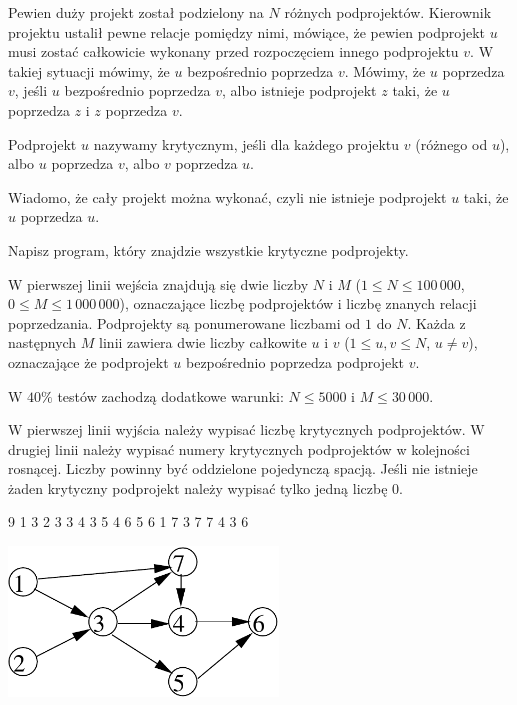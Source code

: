 

\usepackage[utf8]{inputenc}
\usepackage[T1]{fontenc}
\usepackage[polish]{babel}
\usepackage{polski}





Pewien duży projekt został podzielony na $N$ różnych podprojektów.
Kierownik projektu ustalił pewne relacje pomiędzy nimi, mówiące, że pewien podprojekt $u$
	musi zostać całkowicie wykonany przed rozpoczęciem innego podprojektu $v$.
W takiej sytuacji mówimy, że $u$ bezpośrednio poprzedza $v$.
Mówimy, że $u$ poprzedza $v$, jeśli $u$ bezpośrednio poprzedza $v$, albo istnieje podprojekt $z$ taki,
	że $u$ poprzedza $z$ i $z$ poprzedza $v$.

Podprojekt $u$ nazywamy krytycznym, jeśli dla każdego projektu $v$ (różnego od $u$),
	albo $u$ poprzedza $v$, albo $v$ poprzedza $u$.

Wiadomo, że cały projekt można wykonać, czyli nie istnieje podprojekt $u$ taki, że $u$ poprzedza $u$.


Napisz program, który znajdzie wszystkie krytyczne podprojekty.


W pierwszej linii wejścia znajdują się dwie liczby $N$ i $M$ ($1 \le N \le 100\,000$, $0 \le M \le 1\,000\,000$),
	oznaczające liczbę podprojektów i liczbę znanych relacji poprzedzania.
Podprojekty są ponumerowane liczbami od $1$ do $N$.
Każda z następnych $M$ linii zawiera dwie liczby całkowite $u$ i $v$ ($1 \le u, v \le N$, $u \neq v$),
	oznaczające że podprojekt $u$ bezpośrednio poprzedza podprojekt $v$.

W $40\%$ testów zachodzą dodatkowe warunki: $N \le 5000$ i $M \le 30\,000$.


W pierwszej linii wyjścia należy wypisać liczbę krytycznych podprojektów.
W drugiej linii należy wypisać numery krytycznych podprojektów w kolejności rosnącej.
Liczby powinny być oddzielone pojedynczą spacją.
Jeśli nie istnieje żaden krytyczny podprojekt należy wypisać tylko jedną liczbę $0$.


 9
1 3
2 3
3 4
3 5
4 6
5 6
1 7
3 7
7 4
3 6
\sampleCOMMENT

\sampleEND

\includegraphics[height=4cm]{img/critical-fig.pdf}
\bigskip


